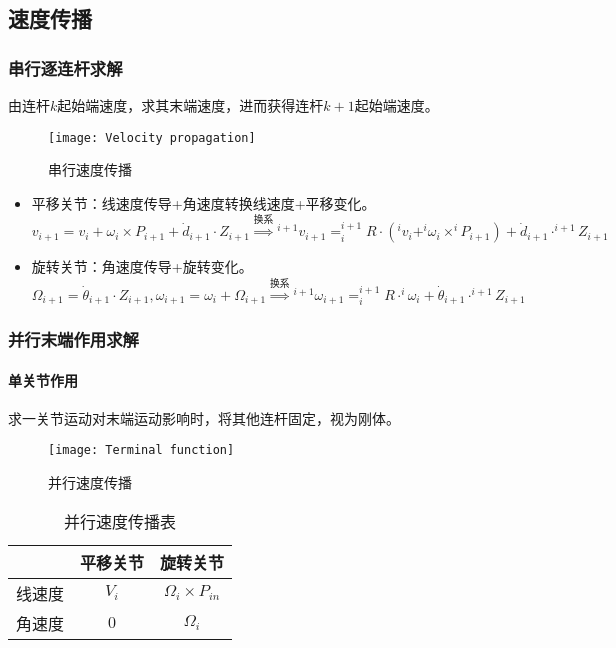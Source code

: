 \documentclass[
12pt, %
a4paper, 
oneside, %
headinclude,footinclude, %
]{scrartcl}
\begin{document}
\subsection{速度传播}
\subsubsection{串行逐连杆求解}
由连杆$ k $起始端速度，求其末端速度，进而获得连杆$ k + 1 $起始端速度。
\begin{figure}[H]
\centering 
\texttt{[image: Velocity propagation]} 
\caption[串行速度传播]{串行速度传播}
\end{figure}

\begin{itemize}
\item 平移关节：线速度传导+角速度转换线速度+平移变化。
$$
v_{i + 1} = v_i + \omega_i \times P_{i + 1} + \dot{d}_{i + 1} \cdot Z_{i + 1}
\overset{\text{换系}}{\Longrightarrow}
{}^{i + 1}v_{i + 1} = ^{i + 1}_i R \cdot (^i v_i + ^i\omega_i \times ^i P_{i + 1}) + \dot{d}_{i + 1} \cdot ^{i + 1}Z_{i + 1}
$$
\item 旋转关节：角速度传导+旋转变化。
$$
\Omega_{i + 1} = \dot{\theta}_{i + 1} \cdot Z_{i + 1}, \omega_{i + 1} = \omega_i + \Omega_{i + 1}
\overset{\text{换系}}{\Longrightarrow}
{}^{i + 1}\omega_{i + 1} = ^{i + 1}_i R \cdot ^i\omega_i + \dot{\theta}_{i + 1} \cdot ^{i + 1}Z_{i + 1}
$$
\end{itemize} 
\subsubsection{并行末端作用求解}\label{sec:Terminal_function}
\paragraph{单关节作用}\label{sec:bingxing}
求一关节运动对末端运动影响时，将其他连杆固定，视为刚体。
\begin{figure}[H]
\centering 
\texttt{[image: Terminal function]} 
\caption[并行速度传播]{并行速度传播}
\end{figure}

\begin{table}[H]
\centering
\begin{tabular}{c|cc}
\hline
& 平移关节 & 旋转关节 \\
\hline
线速度 & $ V_i $ & $ \Omega_i \times P_{in} $ \\
角速度 & $ 0 $ & $ \Omega_i $ \\
\hline
\end{tabular}
\caption{并行速度传播表}
\end{table}
\end{document}
